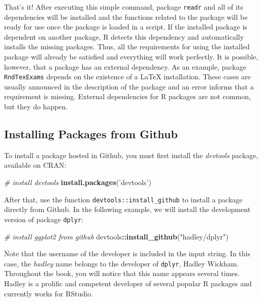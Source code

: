 \documentclass[
  12pt,
]{book}
\newenvironment{Shaded}{\begin{snugshade}}{\end{snugshade}}
\newcommand{\CommentTok}[1]{\textcolor[rgb]{0.37,0.37,0.37}{\textit{#1}}}
\newcommand{\KeywordTok}[1]{\textcolor[rgb]{0.27,0.27,0.27}{\textbf{#1}}}
\newcommand{\NormalTok}[1]{#1}
\newcommand{\OperatorTok}[1]{\textcolor[rgb]{0.43,0.43,0.43}{\textbf{#1}}}
\newcommand{\StringTok}[1]{\textcolor[rgb]{0.5,0.5,0.5}{#1}}
\begin{document}
That's it! After executing this simple command, package \texttt{readr} and all of its dependencies will be installed and the functions related to the package will be ready for use once the package is loaded in a script. If the installed package is dependent on another package, R detects this dependency and automatically installs the missing packages. Thus, all the requirements for using the installed package will already be satisfied and everything will work perfectly. It is possible, however, that a package has an external dependency. As an example, package \texttt{RndTexExams} depends on the existence of a LaTeX installation. These cases are usually announced in the description of the package and an error informs that a requirement is missing. External dependencies for R packages are not common, but they do happen.

\hypertarget{installing-packages-from-github}{%
\subsection{Installing Packages from Github}\label{installing-packages-from-github}}

To install a package hosted in Github, you must first install the \emph{devtools} package, available on CRAN: 

\begin{Shaded}
\begin{Highlighting}[]
\CommentTok{# install devtools}
\KeywordTok{install.packages}\NormalTok{(}\StringTok{'devtools'}\NormalTok{)}
\end{Highlighting}
\end{Shaded}

After that, use the function \texttt{devtools::install\_github} to install a package directly from Github. In the following example, we will install the development version of package \texttt{dplyr}: 

\begin{Shaded}
\begin{Highlighting}[]
\CommentTok{# install ggplot2 from github}
\NormalTok{devtools}\OperatorTok{::}\KeywordTok{install_github}\NormalTok{(}\StringTok{"hadley/dplyr"}\NormalTok{)}
\end{Highlighting}
\end{Shaded}

Note that the username of the developer is included in the input string. In this case, the \emph{hadley} name belongs to the developer of \texttt{dplyr}, Hadley Wickham. Throughout the book, you will notice that this name appears several times. Hadley is a prolific and competent developer of several popular R packages and currently works for RStudio.
\end{document}
